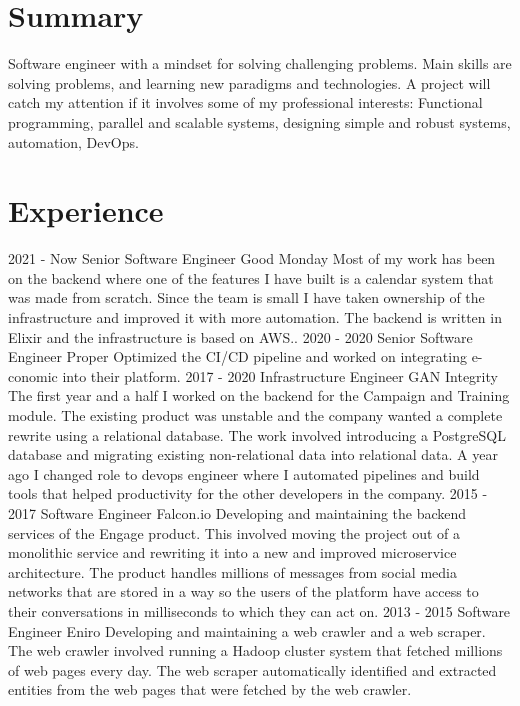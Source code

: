 \documentclass[]{friggeri-cv}
\begin{document}
\section{Summary}
Software engineer with a mindset for solving challenging problems. Main skills are solving problems, and learning new paradigms and technologies. A project will catch my attention if it involves some of my professional interests: Functional programming, parallel and scalable systems, designing simple and robust systems, automation, DevOps.

\section{Experience}
\begin{entrylist}
    \entry
    {2021 - Now}
    {Senior Software Engineer}
    {Good Monday}
    {Most of my work has been on the backend where one of the features I have built is a calendar system that was made from scratch. Since the team is small I have taken ownership of the infrastructure and improved it with more automation. The backend is written in Elixir and the infrastructure is based on AWS..}
    \entry
    {2020 - 2020}
    {Senior Software Engineer}
    {Proper}
    {Optimized the CI/CD pipeline and worked on integrating e-conomic into their platform.}
    \entry
    {2017 - 2020}
    {Infrastructure Engineer}
    {GAN Integrity}
    {The first year and a half I worked on the backend for the Campaign and Training module. The existing product was unstable and the company wanted a complete rewrite using a relational database.  
    The work involved introducing a PostgreSQL database and migrating existing non-relational data into relational data.
    A year ago I changed role to devops engineer where I automated pipelines and build tools that helped productivity for the other developers in the company.}
    \entry
    {2015 - 2017}
    {Software Engineer}
    {Falcon.io}
    {Developing and maintaining the backend services of the Engage product. This involved moving the project out of a monolithic service and rewriting it into a new and improved microservice architecture. The product handles millions of messages from social media networks that are stored in a way so the users of the platform have access to their conversations in milliseconds to which they can act on.}
    \entry
    {2013 - 2015}
    {Software Engineer}
    {Eniro}
    {Developing and maintaining a web crawler and a web scraper. The web crawler involved running a Hadoop cluster system that fetched millions of web pages every day. The web scraper automatically identified and extracted entities from the web pages that were fetched by the web crawler.}
\end{entrylist}
\\
\end{document}
